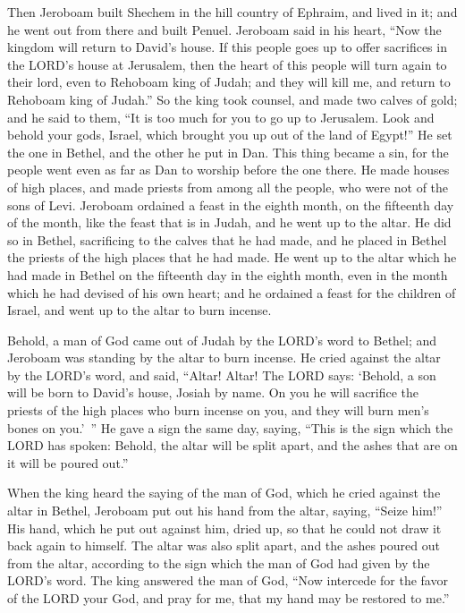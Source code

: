 \myverse{}Then Jeroboam built Shechem in the hill country of Ephraim,
and lived in it; and he went out from there and built Penuel.
\myverse{}Jeroboam said in his heart, “Now the kingdom will return to David’s house.
\myverse{}If this people goes up to offer sacrifices in the LORD’s house at Jerusalem,
then the heart of this people will turn again to their lord, even to Rehoboam king of Judah; and they
will kill me, and return to Rehoboam king of Judah.”
\myverse{}So the king took counsel, and made two calves of gold; and he said to them,
“It is too much for you to go up to Jerusalem. Look and behold your gods, Israel, which brought you up
out of the land of Egypt!”
\myverse{}He set the one in Bethel, and the other he put in Dan.
\myverse{}This thing became a sin, for the people went even as far as Dan to worship
before the one there.
\myverse{}He made houses of high places, and made priests from among all the people,
who were not of the sons of Levi.
\myverse{}Jeroboam ordained a feast in the eighth month, on the fifteenth day of the
month, like the feast that is in Judah, and he went up to the altar. He did so in Bethel, sacrificing
to the calves that he had made, and he placed in Bethel the priests of the high places that he had made.
\myverse{}He went up to the altar which he had made in Bethel on the fifteenth day
in the eighth month, even in the month which he had devised of his own heart; and he ordained a feast
for the children of Israel, and went up to the altar to burn incense.


\mychapter{} \myverse*{}Behold, a man of God came out of Judah by the LORD’s word to Bethel;
and Jeroboam was standing by the altar to burn incense.
\myverse{}He cried against the altar by the LORD’s word, and said, “Altar! Altar! The
LORD says: ‘Behold, a son will be born to David’s house, Josiah by name. On you he will sacrifice the
priests of the high places who burn incense on you, and they will burn men’s bones on you.’ ”
\myverse{}He gave a sign the same day, saying, “This is the sign which the LORD has spoken:
Behold, the altar will be split apart, and the ashes that are on it will be poured out.”

\myverse{}When the king heard the saying of the man of God, which he cried
against the altar in Bethel, Jeroboam put out his hand from the altar, saying, “Seize him!” His hand,
which he put out against him, dried up, so that he could not draw it back again to himself.
\myverse{}The altar was also split apart, and the ashes poured out from the altar, according
to the sign which the man of God had given by the LORD’s word.
\myverse{}The king answered the man of God, “Now intercede for the favor of the LORD
your God, and pray for me, that my hand may be restored to me.”

